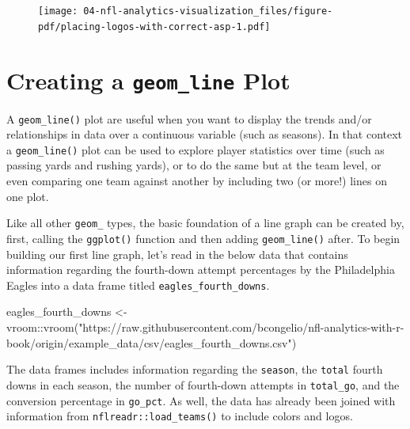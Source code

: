 \documentclass[
  letterpaper,
]{krantz}
\newenvironment{Shaded}{\begin{snugshade}}{\end{snugshade}}
\newcommand{\FunctionTok}[1]{\textcolor[rgb]{0.28,0.35,0.67}{#1}}
\newcommand{\NormalTok}[1]{\textcolor[rgb]{0.00,0.23,0.31}{#1}}
\newcommand{\OtherTok}[1]{\textcolor[rgb]{0.00,0.23,0.31}{#1}}
\newcommand{\SpecialCharTok}[1]{\textcolor[rgb]{0.37,0.37,0.37}{#1}}
\newcommand{\StringTok}[1]{\textcolor[rgb]{0.13,0.47,0.30}{#1}}
\begin{document}
\begin{figure}[H]

{\centering \texttt{[image: 04-nfl-analytics-visualization\_files/figure-pdf/placing-logos-with-correct-asp-1.pdf]}

}

\end{figure}

\hypertarget{creating-a-geom_line-plot}{%
\section{\texorpdfstring{Creating a \texttt{geom\_line}
Plot}{Creating a geom\_line Plot}}\label{creating-a-geom_line-plot}}

A \texttt{geom\_line()} plot are useful when you want to display the
trends and/or relationships in data over a continuous variable (such as
seasons). In that context a \texttt{geom\_line()} plot can be used to
explore player statistics over time (such as passing yards and rushing
yards), or to do the same but at the team level, or even comparing one
team against another by including two (or more!) lines on one plot.

Like all other \texttt{geom\_} types, the basic foundation of a line
graph can be created by, first, calling the \texttt{ggplot()} function
and then adding \texttt{geom\_line()} after. To begin building our first
line graph, let's read in the below data that contains information
regarding the fourth-down attempt percentages by the Philadelphia Eagles
into a data frame titled \texttt{eagles\_fourth\_downs}.

\begin{Shaded}
\begin{Highlighting}[]
\NormalTok{eagles\_fourth\_downs }\OtherTok{\textless{}{-}}
\NormalTok{  vroom}\SpecialCharTok{::}\FunctionTok{vroom}\NormalTok{(}\StringTok{"https://raw.githubusercontent.com/bcongelio/nfl{-}analytics{-}with{-}r{-}book/origin/example\_data/csv/eagles\_fourth\_downs.csv"}\NormalTok{)}
\end{Highlighting}
\end{Shaded}

The data frames includes information regarding the \texttt{season}, the
\texttt{total} fourth downs in each season, the number of fourth-down
attempts in \texttt{total\_go}, and the conversion percentage in
\texttt{go\_pct}. As well, the data has already been joined with
information from \texttt{nflreadr::load\_teams()} to include colors and
logos.
\end{document}
